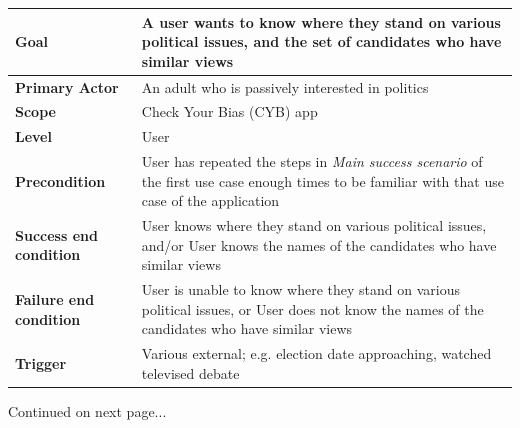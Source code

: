 \documentclass[11pt]{article}
\begin{document}
\begin{centering}
\begin{tabular}{|p{2.5cm}|p{13cm}|}
    \hline
    \textbf{Goal} & A user wants to know where they stand on various political issues, and the set of candidates who have similar views\\
    \hline
    \textbf{Primary \newline Actor} & An adult who is passively interested in politics\\
    \hline
    \textbf{Scope} & Check Your Bias (CYB) app\\
    \hline
    \textbf{Level} & User\\
    \hline
    \textbf{Precondition} & User has repeated the steps in {\em Main success scenario} of the first use case enough times to be familiar with that use case of the application\\
    \hline
    \textbf{Success end \newline condition} & User knows where they stand on various political issues, and/or User knows the names of the candidates who have similar views\\
    \hline
    \textbf{Failure end \newline condition} & User is unable to know where they stand on various political issues, or User does not know the names of the candidates who have similar views\\
    \hline
    \textbf{Trigger} & Various external; e.g. election date approaching, watched televised debate\\
    \hline
\end{tabular}

\vspace{20pt}

Continued on next page...


\end{centering}
\end{document}
